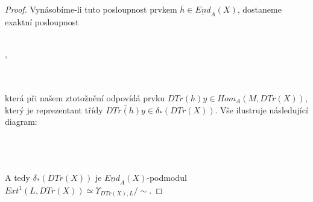 \begin{proof}
         Vynásobíme-li tuto posloupnost prvkem $\bar{h}\in \underline{End}_A(X)$, dostaneme exaktní 
         posloupnost   \\\\
          \centerline{,}\\\\
          která při našem ztotožnění odpovídá prvku $DTr(h)y\in Hom_A(M,DTr(X))$, který je reprezentant 
          třídy $\bar{DTr(h)y}\in\delta_*(DTr(X))$. Vše ilustruje následující 
          diagram:  \\
          \centerline{}\\\\\\
          A tedy $\delta_*(DTr(X))$ je $\underline{End}_A(X)$-podmodul 
          $Ext^1(L,DTr(X))\simeq \Upsilon_{DTr(X),L}/\sim$.
        \end{proof}
        
